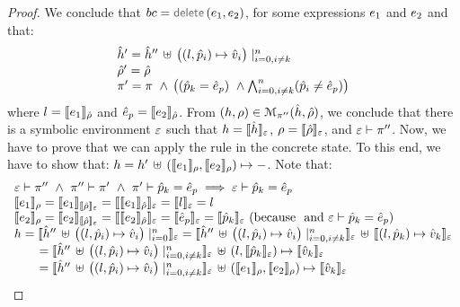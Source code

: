 \begin{proof}
\noindent{}
We conclude that $\bcmd = \jsildelete(\jsilexpr_1, \jsilexpr_2)$, for some expressions $\jsilexpr_1$ and $\jsilexpr_2$
and that: 
$$
\begin{array}{l}
\sheap' = \sheap'' \, \uplus \,  \big((\loc, \sexprp_i) \mapsto \sexprv_i\big)\mid_{i = 0, i \neq k}^n
\\ 
\sstore' = \sstore
\\ 
 \pc' = \pc \ \wedge \, \big( (\sexprp_k = \sexpr_p) \ \wedge \bigwedge_{i = 0, i \neq k}^n (\sexprp_i \neq \sexpr_p) \big)
\end{array}
$$
where $\loc = \symbeval{\jsilexpr_1}{\sstore}$ and $\sexpr_p = \symbeval{\jsilexpr_2}{\sstore}$.
From $(\heap, \store) \in \smodels{\sheap, \sstore}{\pc''}$, we conclude that there is a symbolic environment
$\senv$ such that $\heap = \semexpr{\sheap}{\senv}$, $\store = \semexpr{\sstore}{\senv}$, and 
$\senv \vdash \pc''$. 
Now, we have to prove that we can apply the  rule in the concrete state.
To this end, we have to show that:
$\heap = \heap' \dunion \hcell{\symbeval{\jsilexpr_1}{\store}}{\symbeval{\jsilexpr_2}{\store}}{-}$. 
Note that: 
$$
\begin{array}{l}
%
\senv \vdash \pc'' \ \wedge \ \pc'' \vdash \pc' \ \wedge \ \pc' \vdash \sexprp_k = \sexpr_p \implies \senv \vdash \sexprp_k = \sexpr_p \\
%
 \symbeval{\jsilexpr_1}{\store} = \symbeval{\jsilexpr_1}{\symbeval{\sstore}{\senv}} = \symbeval{\symbeval{\jsilexpr_1}{\sstore}}{\senv} 
    = \symbeval{\loc}{\senv} = \loc \\ 
  \symbeval{\jsilexpr_2}{\store}  = \symbeval{\jsilexpr_2}{\semexpr{\sstore}{\senv}} =  \symbeval{\symbeval{\jsilexpr_2}{\sstore}}{\senv}
   =  \symbeval{\sexpr_p}{\senv} = \symbeval{\sexprp_k}{\senv}  \text{ (because $$ and $\senv \vdash \sexprp_k = \sexpr_p$)} \\
 \heap = \semexpr{\sheap'' \, \uplus \, \big((l, \sexprp_i) \mapsto \sexprv_i\big)\mid_{i = 0}^n}{\senv} 
       =  \semexpr{\sheap'' \, \uplus \, \big((l, \sexprp_i) \mapsto \sexprv_i\big)\mid_{i = 0, i \neq k}^n}{\senv} \dunion \semexpr{(l, \sexprp_k) \mapsto \sexprv_k}{\senv} \\
         \qquad = \semexpr{\sheap'' \, \uplus \, \big((l, \sexprp_i) \mapsto \sexprv_i\big)\mid_{i = 0, i \neq k}^n}{\senv} \dunion (l, \semexpr{\sexprp_k}{\senv}) \mapsto \semexpr{\sexprv_k}{\senv}  \\ 
         \qquad =  \semexpr{\sheap'' \, \uplus \, \big((l, \sexprp_i) \mapsto \sexprv_i\big)\mid_{i = 0, i \neq k}^n}{\senv} \dunion (\symbeval{\jsilexpr_1}{\store}, \symbeval{\jsilexpr_2}{\store}) \mapsto \semexpr{\sexprv_k}{\senv} \\ 

\end{array}$$
\end{proof}
